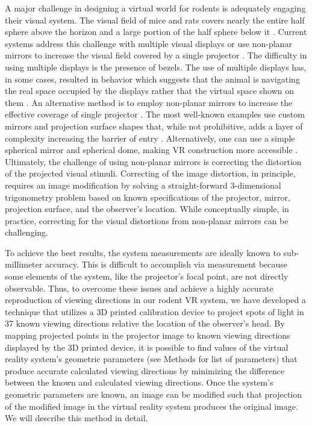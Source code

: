 \documentclass[10pt,letterpaper]{article}
\begin{document}
A major challenge in designing a virtual world for rodents is adequately
engaging their visual system. The visual field of mice and rats covers nearly
the entire half sphere above the horizon and a large portion of the half sphere
below it \cite{hughes1977topography, wagor1980retinotopic, schuett2002mapping,
wang2007area}. Current systems address this challenge with multiple visual
displays \cite{keller2012sensorimotor, ayaz2013locomotion,
saleem2013integration} or use non-planar mirrors to increase the visual field
covered by a single projector \cite{harvey2009intracellular,
schmidt2013cellular, aronov2014engagement}. The difficulty in using multiple
displays is the presence of bezels.  The use of multiple displays has, in some
cases, resulted in behavior which suggests that the animal is navigating the
real space occupied by the displays rather that the virtual space shown on them
\cite{holscher2005rats}. An alternative method is to employ non-planar mirrors
to increase the effective coverage of single projector
\cite{harvey2009intracellular, schmidt2013cellular, aronov2014engagement}.  The
most well-known examples use custom mirrors and projection surface shapes that,
while not prohibitive, adds a layer of complexity increasing the barrier of
entry \cite{holscher2005rats, harvey2009intracellular}. Alternatively, one can
use a simple spherical mirror and spherical dome, making VR construction more
accessible \cite {schmidt2013cellular}. Ultimately, the challenge of using
non-planar mirrors is correcting the distortion of the projected visual
stimuli. Correcting of the image distortion, in principle, requires an image
modification by solving a straight-forward 3-dimensional trigonometry problem
based on known specifications of the projector, mirror, projection surface, and
the observer’s location. While conceptually simple, in practice, correcting for
the visual distortions from non-planar mirrors can be challenging.

To achieve the best results, the system measurements are ideally known to
sub-millimeter accuracy. This is difficult to accomplish via measurement
because some elements of the system, like the projector's focal point, are not
directly observable. Thus, to overcome these issues and achieve a highly
accurate reproduction of viewing directions in our rodent VR system, we have
developed a technique that utilizes a 3D printed calibration device to project
spots of light in 37 known viewing directions relative the location of the
observer's head. By mapping projected points in the projector image to known
viewing directions displayed by the 3D printed device, it is possible to find
values of the virtual reality system's geometric parameters (see Methods for
list of parameters) that produce accurate calculated viewing directions by
minimizing the difference between the known and calculated viewing directions.
Once the system’s geometric parameters are known, an image can be modified such
that projection of the modified image in the virtual reality system produces
the original image. We will describe this method in detail. 
\end{document}
